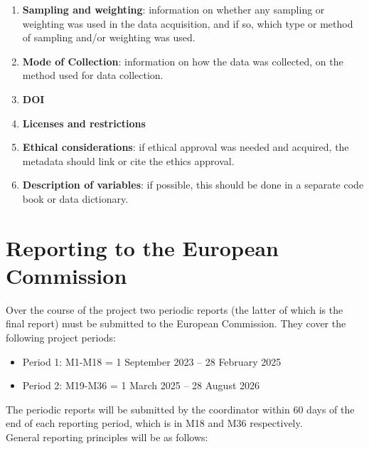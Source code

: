 \documentclass[
]{article}
\providecommand{\tightlist}{%
  \setlength{\itemsep}{0pt}\setlength{\parskip}{0pt}}
\begin{document}
\begin{enumerate}
\item
  \textbf{Sampling and weighting}: information on whether any sampling or weighting was used in the data acquisition, and if so, which type or method of sampling and/or weighting was used.\\
\item
  \textbf{Mode of Collection}: information on how the data was collected, on the method used for data collection.\\
\item
  \textbf{DOI}\\
\item
  \textbf{Licenses and restrictions}\\
\item
  \textbf{Ethical considerations}: if ethical approval was needed and acquired, the metadata should link or cite the ethics approval.\\
\item
  \textbf{Description of variables}: if possible, this should be done in a separate code book or data dictionary.
\end{enumerate}

\hypertarget{reporting-to-the-european-commission}{%
\section{\texorpdfstring{\textbf{Reporting to the European Commission}}{Reporting to the European Commission}}\label{reporting-to-the-european-commission}}

Over the course of the project two periodic reports (the latter of which is the final report) must be submitted to the European Commission. They cover the following project periods:

\begin{itemize}
\tightlist
\item
  Period 1: M1-M18 = 1 September 2023 -- 28 February 2025\\
\item
  Period 2: M19-M36 = 1 March 2025 -- 28 August 2026
\end{itemize}

The periodic reports will be submitted by the coordinator within 60 days of the end of each reporting period, which is in M18 and M36 respectively.\\
General reporting principles will be as follows:
\end{document}
